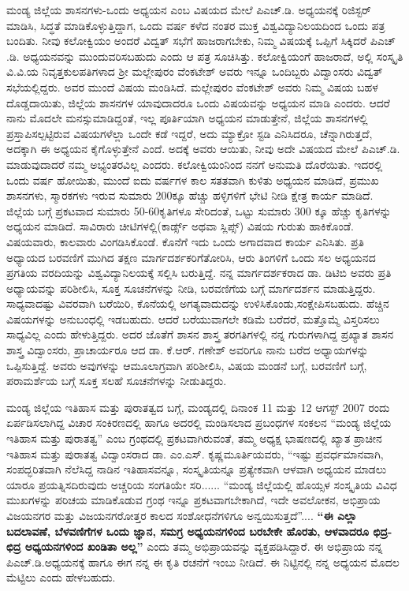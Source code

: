 ಮಂಡ್ಯ ಜಿಲ್ಲೆಯ ಶಾಸನಗಳು-ಒಂದು ಅಧ್ಯಯನ ಎಂಬ ವಿಷಯದ ಮೇಲೆ ಪಿಎಚ್​.ಡಿ. ಅಧ್ಯಯನಕ್ಕೆ ರಿಜಿಸ್ಟರ್​ ಮಾಡಿಸಿ, ಸಿದ್ಧತೆ ಮಾಡಿಕೊಳ್ಳುತ್ತಿದ್ದಾಗ, ಒಂದು ವರ್ಷ ಕಳೆದ ನಂತರ ಮುಕ್ತ ವಿಶ್ವವಿದ್ಯಾನಿಲಯದಿಂದ ಒಂದು ಪತ್ರ ಬಂದಿತು. ನೀವು ಕಲೋಕ್ವಿಯಂ ಅಂದರೆ ವಿದ್ವತ್​ ಸಭೆಗೆ ಹಾಜರಾಗಬೇಕು, ನಿಮ್ಮ ವಿಷಯಕ್ಕೆ ಒಪ್ಪಿಗೆ ಸಿಕ್ಕಿದರೆ ಪಿಎಚ್​.ಡಿ. ಅಧ್ಯಯನವನ್ನು ಮುಂದುವರಿಸಬಹುದು ಎಂದು ಆ ಪತ್ರ ಸೂಚಿಸಿತ್ತು. ಕಲೋಕ್ವಿಯಂಗೆ ಹಾಜರಾದೆ, ಅಲ್ಲಿ ಸಂಸ್ಕೃತಿ ವಿ.ವಿ.ಯ ನಿವೃತ್ತ\break ಕುಲ\-ಪತಿಗಳಾದ ಶ‍್ರೀ ಮಲ್ಲೇಪುರಂ ವೆಂಕಟೇಶ್​ ಅವರು ಇನ್ನೂ ಒಂದಿಬ್ಬರು ವಿದ್ವಾಂಸರು ವಿದ್ವತ್​ ಸಭೆಯಲ್ಲಿದ್ದರು. ಅವರ ಮುಂದೆ ವಿಷಯ ಮಂಡಿಸಿದೆ. ಮಲ್ಲೇಪುರಂ ವೆಂಕಟೇಶ್​ ಅವರು ನಿಮ್ಮ ವಿಷಯ ಬಹಳ ದೊಡ್ಡದಾಯಿತು, ಜಿಲ್ಲೆಯ ಶಾಸನಗಳ ಯಾವುದಾದರೂ ಒಂದು ವಿಷಯವನ್ನು ಅಧ್ಯಯನ ಮಾಡಿ ಎಂದರು. ಆದರೆ ನಾನು ಮೊದಲೇ ಮನಸ್ಸು\break ಮಾಡಿದ್ದಂತೆ, ಇಲ್ಲ ಪೂರ್ತಿಯಾಗಿ ಅಧ್ಯಯನ ಮಾಡುತ್ತೇನೆ, ಜಿಲ್ಲೆಯ ಶಾಸನಗಳಲ್ಲಿ ಪ್ರಸ್ತಾಪಿಸಲ್ಪಟ್ಟಿರುವ ವಿಷಯಗಳೆಲ್ಲಾ ಒಂದೇ ಕಡೆ ಇದ್ದರೆ, ಅದು ಮ್ಯಾಕ್ರೋ ಸ್ಟಡಿ ಎನಿಸಿದರೂ, ಚೆನ್ನಾಗಿರುತ್ತದೆ, ಅದಕ್ಕಾಗಿ ಈ ಅಧ್ಯಯನ ಕೈಗೊಳ್ಳುತ್ತೇನೆ ಎಂದೆ. ಅದಕ್ಕೆ ಅವರು ಆಯಿತು, ನೀವು ಅದೇ ವಿಷಯದ ಮೇಲೆ ಪಿಎಚ್​.ಡಿ. ಮಾಡುವುದಾದರೆ ನಮ್ಮ ಅಭ್ಯಂತರವಿಲ್ಲ ಎಂದರು. ಕಲೋಕ್ವಿಯಂನಿಂದ ನನಗೆ ಅನುಮತಿ ದೊರೆಯಿತು. ಇದರಲ್ಲಿ ಒಂದು ವರ್ಷ ಹೋಯಿತು, ಮುಂದೆ ಐದು ವರ್ಷಗಳ ಕಾಲ ಸತತವಾಗಿ ಕುಳಿತು ಅಧ್ಯಯನ ಮಾಡಿದೆ, ಪ್ರಮುಖ ಶಾಸನಗಳು, ಸ್ಮಾರಕಗಳು ಇರುವ ಸುಮಾರು 200ಕ್ಕೂ ಹೆಚ್ಚು ಹಳ್ಳಿಗಳಿಗೆ ಭೇಟಿ ನೀಡಿ ಕ್ಷೇತ್ರ ಕಾರ್ಯ ಮಾಡಿದೆ. ಜಿಲ್ಲೆಯ ಬಗ್ಗೆ ಪ್ರಕಟವಾದ ಸುಮಾರು 50-60\break ಕೃತಿಗಳೂ ಸೇರಿದಂತೆ, ಒಟ್ಟು ಸುಮಾರು 300 ಕ್ಕೂ ಹೆಚ್ಚು ಕೃತಿಗಳನ್ನು ಅಧ್ಯಯನ ಮಾಡಿದೆ. ಸಾವಿರಾರು ಚೀಟಿಗಳಲ್ಲಿ\break (ಕಾರ್ಡ್ಸ್ ಅಥವಾ ಸ್ಲಿಪ್ಸ್​) ವಿಷಯ ಗುರುತು ಹಾಕಿಕೊಂಡೆ. ವಿಷಯವಾರು, ಕಾಲವಾರು ವಿಂಗಡಿಸಿ\-ಕೊಂಡೆ. ಕೊನೆಗೆ ಇದು ಒಂದು ಅಗಾದವಾದ ಕಾರ್ಯ ಎನಿಸಿತು. ಪ್ರತಿ ಅಧ್ಯಾಯದ ಬರವಣಿಗೆ ಮುಗಿದ ತಕ್ಷಣ ಮಾರ್ಗದರ್ಶಕರಿಗೆ\break ತೋರಿಸಿ, ಆರು ತಿಂಗಳಿಗೆ ಒಂದು ಸಲ ಅಧ್ಯಯನದ ಪ್ರಗತಿಯ ವರದಿಯನ್ನು ವಿಶ್ವವಿದ್ಯಾನಿಲಯಕ್ಕೆ ಸಲ್ಲಿಸಿ ಬರುತ್ತಿದ್ದೆ. ನನ್ನ ಮಾರ್ಗದರ್ಶಕರಾದ ಡಾ. ಡಿಟಿಬಿ ಅವರು ಪ್ರತಿ ಅಧ್ಯಾಯವನ್ನು ಪರಿಶೀಲಿಸಿ, ಸೂಕ್ತ ಸೂಚನೆಗಳನ್ನು ನೀಡಿ, ಬರವಣಿಗೆಯ ಬಗ್ಗೆ ಮಾರ್ಗದರ್ಶನ ಮಾಡುತ್ತಿದ್ದರು. ಸಾಧ್ಯವಾದಷ್ಟು ವಿವರವಾಗಿ ಬರೆಯಿರಿ, ಕೊನೆಯಲ್ಲಿ ಅಗತ್ಯವಾದುದನ್ನು ಉಳಿಸಿಕೊಂಡು,\break ಸಂಕ್ಷೇಪಿಸಬಹುದು. ಹೆಚ್ಚಿನ ವಿಷಯಗಳನ್ನು ಅನುಬಂಧಲ್ಲಿ ಇಡಬಹುದು. ಆದರೆ ಬರೆಯುವಾಗಲೇ ಕಡಿಮೆ ಬರೆದರೆ, ಮತ್ತೊಮ್ಮೆ ವಿಸ್ತರಿಸಲು ಸಾಧ್ಯವಿಲ್ಲ ಎಂದು ಹೇಳುತ್ತಿದ್ದರು. ಅದರ ಜೊತೆಗೆ ಶಾಸನ ಶಾಸ್ತ್ರ ತರಗತಿಗಳಲ್ಲಿ ನನ್ನ ಗುರುಗಳಾಗಿದ್ದ ಪ್ರಖ್ಯಾತ ಶಾಸನ ಶಾಸ್ತ್ರ ವಿದ್ವಾಂಸರು, ಪ್ರಾಚಾರ್ಯರೂ ಆದ ಡಾ. ಕೆ.ಆರ್​. ಗಣೇಶ್​ ಅವರಿಗೂ ನಾನು ಬರೆದ ಅಧ್ಯಾಯಗಳನ್ನು ಒಪ್ಪಿಸುತ್ತಿದ್ದೆ. ಅವರು ಅವುಗಳನ್ನು ಆಮೂಲಾಗ್ರವಾಗಿ ಪರಿಶೀಲಿಸಿ, ವಿಷಯ ಮಂಡನೆ ಬಗ್ಗೆ, ಬರವಣಿಗೆ ಬಗ್ಗೆ, ಪರಾಮರ್ಶೆಯ ಬಗ್ಗೆ ಸೂಕ್ತ ಸಲಹೆ ಸೂಚನೆಗಳನ್ನು ನೀಡುತಿದ್ದರು.

ಮಂಡ್ಯ ಜಿಲ್ಲೆಯ ಇತಿಹಾಸ ಮತ್ತು ಪುರಾತತ್ವದ ಬಗ್ಗೆ, ಮಂಡ್ಯದಲ್ಲಿ ದಿನಾಂಕ 11 ಮತ್ತು 12 ಆಗಸ್ಟ್​ 2007 ರಂದು ಏರ್ಪಡಿಸಲಾಗಿದ್ದ ವಿಚಾರ ಸಂಕಿರಣದಲ್ಲಿ ಹಾಗೂ ಅದರಲ್ಲಿ ಮಂಡಿಸಲಾದ ಪ್ರಬಂಧಗಳ ಸಂಕಲನ “ಮಂಡ್ಯ ಜಿಲ್ಲೆಯ ಇತಿಹಾಸ ಮತ್ತು ಪುರಾತತ್ವ” ಎಂಬ ಗ್ರಂಥದಲ್ಲಿ ಪ್ರಕಟವಾಗಿರುವಂತೆ, ತಮ್ಮ ಅಧ್ಯಕ್ಷ ಭಾಷಣದಲ್ಲಿ ಖ್ಯಾತ ಪ್ರಾಚೀನ ಇತಿಹಾಸ ಮತ್ತು ಪುರಾತತ್ವ ವಿದ್ವಾಂಸರಾದ ಡಾ. ಎಂ.ಎಸ್​. ಕೃಷ್ಣಮೂರ್ತಿಯವರು, “ಇಷ್ಟು ಪ್ರವರ್ಧಮಾನವಾಗಿ, ಸಂಪದ್ಭರಿತವಾಗಿ ನೆಲೆಸಿದ್ದ ನಾಡಿನ ಇತಿಹಾಸವನ್ನೂ, ಸಂಸ್ಕೃತಿಯನ್ನೂ ಪ್ರತ್ಯೇಕವಾಗಿ ಆಳವಾಗಿ ಅಧ್ಯಯನ ಮಾಡಲು ಯಾರೂ ಪ್ರಯತ್ನಿಸದಿರುವುದು ಅಚ್ಚರಿಯ ಸಂಗತಿಯೇ ಸರಿ...... “ಮಂಡ್ಯ ಜಿಲ್ಲೆಯಲ್ಲಿ ಹೊಯ್ಸಳ ಸಂಸ್ಕೃತಿಯ ವಿವಿಧ ಮುಖ\-ಗಳನ್ನು ಪರಿಚಯ ಮಾಡಿಕೊಡುವ ಗ್ರಂಥ ಇನ್ನೂ ಪ್ರಕಟವಾಗಬೇಕಾಗಿದೆ, ಇದೇ ಅವಲೋಕನ, ಅಭಿಪ್ರಾಯ ವಿಜಯನಗರ ಮತ್ತು ವಿಜಯನಗರೋತ್ತರ ಕಾಲದ ಸಂಶೋಧನೆಗಳಿಗೂ ಅನ್ವಯಿಸುತ್ತದೆ”.... \textbf{“ಈ ಎಲ್ಲಾ ಬದಲಾವಣೆ, ಬೆಳವಣಿಗೆಗಳ ಒಂದು ಜ್ಞಾನ, ಸಮಗ್ರ ಅಧ್ಯಯನಗಳಿಂದ ಬರಬೇಕೇ ಹೊರತು, ಆಳವಾದರೂ ಛಿದ್ರ-ಛಿದ್ರ ಅಧ್ಯಯನಗಳಿಂದ ಖಂಡಿತಾ ಅಲ್ಲ”} ಎಂದು ತಮ್ಮ ಅಭಿಪ್ರಾಯವನ್ನು ವ್ಯಕ್ತಪಡಿಸಿದ್ದಾರೆ. ಈ ಅಭಿಪ್ರಾಯ ನನ್ನ ಪಿಎಚ್​.ಡಿ.ಅಧ್ಯಯನಕ್ಕೆ ಹಾಗೂ ಈಗ ನನ್ನ ಈ ಕೃತಿ ರಚನೆಗೆ ಇಂಬು ನೀಡಿದೆ. ಈ ನಿಟ್ಟಿನಲ್ಲಿ ನನ್ನ ಅಧ್ಯಯನ ಮೊದಲ ಮೆಟ್ಟಿಲು ಎಂದು ಹೇಳಬಹುದು.

